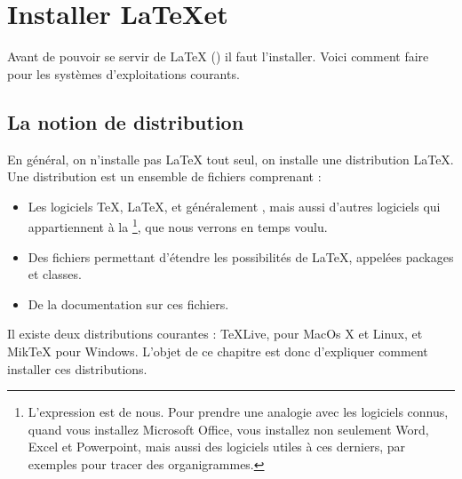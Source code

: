 \chapter{Installer \LaTeX et \XeLaTeX}\label{install}

\begin{prealable}
	Avant de pouvoir se servir de \LaTeX{} (\XeLaTeX) il faut l'installer. Voici comment faire pour les systèmes d'exploitations courants.
\end{prealable}

\section{La notion de distribution}

En général, on n'installe pas \LaTeX{} tout seul, on installe une distribution \LaTeX{}. Une distribution est un ensemble de fichiers comprenant :
\begin{itemize}
\item Les logiciels \TeX, \LaTeX, et généralement \XeLaTeX, mais aussi d'autres logiciels qui appartiennent à la  \footnote{L'expression est de nous. Pour prendre une analogie avec les logiciels connus, quand vous installez Microsoft Office, vous installez non seulement Word, Excel et Powerpoint, mais aussi des logiciels utiles à ces derniers, par exemples pour tracer des organigrammes.}, que nous verrons en temps voulu.
\item Des fichiers permettant d'étendre les possibilités de \LaTeX, appelées packages et classes.
\item De la documentation sur ces fichiers.
\end{itemize}

Il existe deux distributions courantes : TeXLive, pour MacOs X et Linux, et MikTeX pour Windows. L'objet de ce chapitre est donc d'expliquer comment installer ces distributions.




